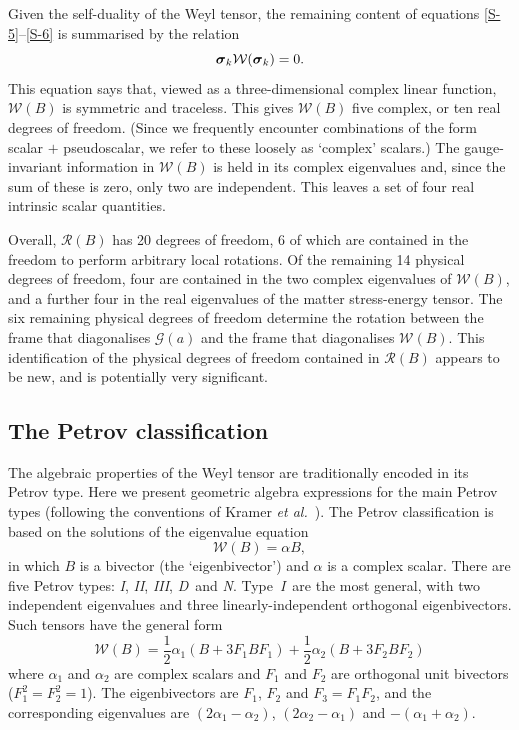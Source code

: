 \documentclass[a4paper]{article}
\numberwithin{equation}{section}
\newcommand{\half}{{\textstyle \frac{1}{2}}}
\newcommand{\eqv}{=}
\newcommand{\alp}{\alpha}
\newcommand{\sig}{\mbox{\boldmath $\sigma$}}
\newcommand{\bsig}{\mbox{\boldmath $\sig$}}
\newcommand{\clg}{{\mathcal{G}}}
\newcommand{\clr}{{\mathcal{R}}}
\newcommand{\clw}{{\mathcal{W}}}
\newcommand{\sigk}{\bsig_k}
\newcommand{\slI}{\textsl{I}}
\newcommand{\slII}{\textsl{II}}
\newcommand{\slIII}{\textsl{III}}
\newcommand{\slD}{\textsl{D}}
\newcommand{\slN}{\textsl{N}}
\begin{document}
Given the self-duality of the Weyl tensor, the remaining content of
equations \eqref{S-5}--\eqref{S-6} is summarised by the relation
%
\begin{equation}
\sigk \clw(\sigk) = 0.
\end{equation}
%
This equation says that, viewed as a three-dimensional complex linear
function, $\clw(B)$ is symmetric and traceless.  This gives $\clw(B)$
five complex, or ten real degrees of freedom.  (Since we frequently
encounter combinations of the form scalar $+$ pseudoscalar, we refer
to these loosely as `complex' scalars.)  The gauge-invariant information
in $\clw(B)$ is held in its complex eigenvalues and, since the sum of
these is zero, only two are independent.  This leaves a set of four
real intrinsic scalar quantities.


Overall, $\clr(B)$ has 20 degrees of freedom, 6 of which are contained
in the freedom to perform arbitrary local rotations.  Of the remaining
14 physical degrees of freedom, four are contained in the two complex
eigenvalues of $\clw(B)$, and a further four in the real eigenvalues
of the matter stress-energy tensor.  The six remaining physical
degrees of freedom determine the rotation between the frame that
diagonalises $\clg(a)$ and the frame that diagonalises $\clw(B)$.
This identification of the physical degrees of freedom contained in
$\clr(B)$ appears to be new, and is potentially very significant.


\subsection{The Petrov classification}
 
The algebraic properties of the Weyl tensor are traditionally encoded
in its Petrov type.  Here we present geometric algebra expressions for
the main Petrov types (following the conventions of Kramer \textit{et
al.}~\cite{kra-exact}).  The Petrov classification is based on the
solutions of the eigenvalue equation
%
\begin{equation}
\clw(B) = \alp B,
\end{equation}
%
in which $B$ is a bivector (the `eigenbivector') and $\alp$ is a
complex scalar.  There are five Petrov types: \slI, \slII, \slIII,
\slD\ and \slN.  Type~\slI\ are the most general, with two independent
eigenvalues and three linearly-independent orthogonal eigenbivectors.
Such tensors have the general form
%
\begin{equation}
\clw(B) = \half \alp_1 (B + 3 F_1 B F_1) + \half \alp_2 (B + 3 F_2 B
F_2) 
\end{equation}
%
where $\alp_1$ and $\alp_2$ are complex scalars and $F_1$ and $F_2$
are orthogonal unit bivectors ($F_1^2=F_2^2=1$).  The eigenbivectors
are $F_1$, $F_2$ and $F_3\eqv F_1F_2$, and the corresponding eigenvalues
are $(2\alp_1-\alp_2)$, $(2\alp_2-\alp_1)$ and $-(\alp_1+\alp_2)$.
\end{document}
